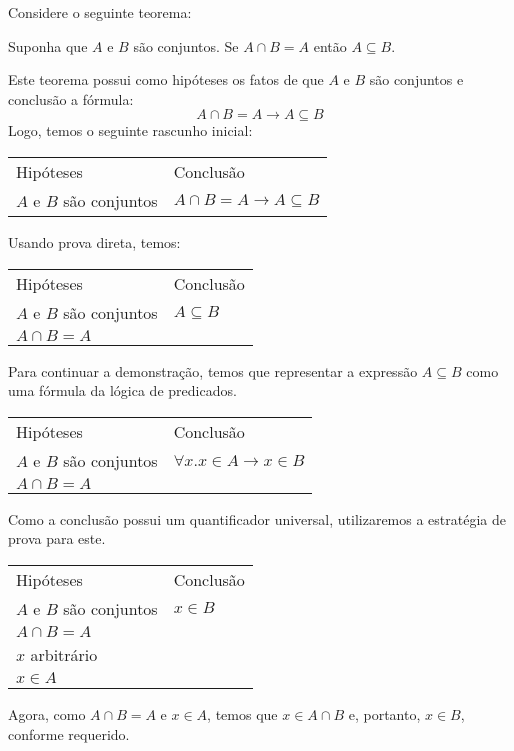 \begin{Example}
Considere o seguinte teorema:
\begin{flushleft}
Suponha que $A$ e $B$ são conjuntos. Se $A\cap B = A$ então
$A\subseteq B$.
\end{flushleft}
Este teorema possui como hipóteses os fatos de que $A$ e $B$ são
conjuntos e conclusão a fórmula:
\[
A \cap B = A \to A\subseteq B
\]
Logo, temos o seguinte rascunho inicial:
\begin{flushleft}
\begin{tabular}{ll}
Hipóteses & Conclusão \\
$A$ e $B$ são conjuntos & $A \cap B = A \to A\subseteq B$\\
\end{tabular}
\end{flushleft}
Usando prova direta, temos:
\begin{flushleft}
\begin{tabular}{ll}
Hipóteses & Conclusão \\
$A$ e $B$ são conjuntos & $A\subseteq B$\\
$A\cap B = A$ & \\
\end{tabular}
\end{flushleft}
Para continuar a demonstração, temos que representar a expressão
$A\subseteq B$ como uma fórmula da lógica de predicados.
\begin{flushleft}
\begin{tabular}{ll}
Hipóteses & Conclusão \\
$A$ e $B$ são conjuntos & $\forall x. x\in A \to x \in B$\\
$A\cap B = A$ & \\
\end{tabular}
\end{flushleft}
Como a conclusão possui um quantificador universal, utilizaremos a
estratégia de prova para este.
\begin{flushleft}
\begin{tabular}{ll}
Hipóteses & Conclusão \\
$A$ e $B$ são conjuntos & $x \in B$\\
$A\cap B = A$ & \\
$x$ arbitrário & \\
$x\in A$ &\\
\end{tabular}
\end{flushleft}
Agora, como $A \cap B = A$ e $x\in A$, temos que $x \in A \cap B$ e,
portanto, $x\in B$, conforme requerido.


\end{Example}
